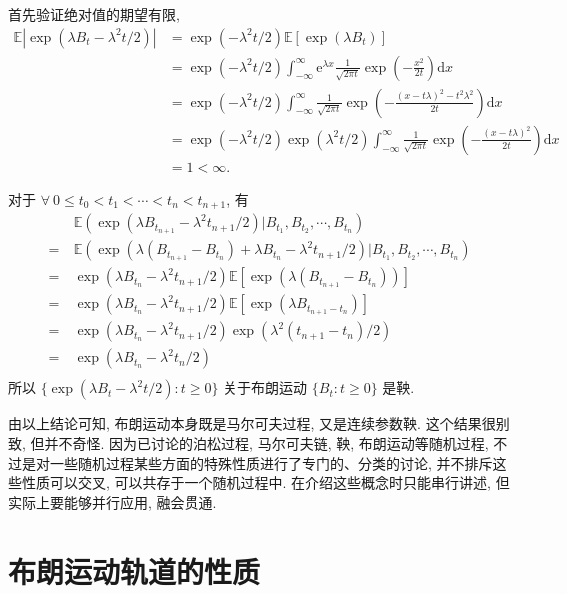 \documentclass[openany]{ctexbook}
\theoremstyle{kaiti}
\theoremstyle{normal}
\begin{document}
首先验证绝对值的期望有限,
\begin{equation}
  \begin{aligned}
    \mathbb{E}|\exp(\lambda B_t-\lambda^2t/2)|
    &=\exp(-\lambda^2t/2)\mathbb{E}[\exp(\lambda B_t)]\\
    &=\exp(-\lambda^2t/2)\int_{-\infty}^\infty\mathrm{e}^{\lambda x}\frac{1}{\sqrt{2\pi t}}\exp\left(-\frac{x^2}{2t}\right)\mathrm{d}x\\
    &=\exp(-\lambda^2t/2)\int_{-\infty}^\infty\frac{1}{\sqrt{2\pi t}}\exp\left(-\frac{(x-t\lambda)^2-t^2\lambda^2}{2t}\right)\mathrm{d}x\\
    &=\exp(-\lambda^2t/2)\exp(\lambda^2t/2)\int_{-\infty}^\infty\frac{1}{\sqrt{2\pi t}}\exp\left(-\frac{(x-t\lambda)^2}{2t}\right)\mathrm{d}x\\
    &=1<\infty.
  \end{aligned}
\end{equation}

对于 $\forall~0\leqslant t_0<t_1<\cdots<t_n<t_{n+1}$, 有
\begin{equation}
  \begin{aligned}
    &~\mathbb{E}(\exp(\lambda B_{t_{n+1}}-\lambda^2t_{n+1}/2)\big|B_{t_1},B_{t_2},\cdots,B_{t_n})\\
    =&~\mathbb{E}(\exp(\lambda(B_{t_{n+1}}-B_{t_n})+\lambda B_{t_n}-\lambda^2t_{n+1}/2)\big|B_{t_1},B_{t_2},\cdots,B_{t_n})\\
    =&~\exp(\lambda B_{t_n}-\lambda^2t_{n+1}/2)\mathbb{E}[\exp(\lambda(B_{t_{n+1}}-B_{t_n}))]\\
    =&~\exp(\lambda B_{t_n}-\lambda^2t_{n+1}/2)\mathbb{E}[\exp(\lambda B_{t_{n+1}-t_n})]\\
    =&~\exp(\lambda B_{t_n}-\lambda^2t_{n+1}/2)\exp(\lambda^2({t_{n+1}-t_n})/2)\\
    =&~\exp(\lambda B_{t_n}-\lambda^2t_{n}/2)\\
  \end{aligned}
\end{equation}
所以 $\{\exp(\lambda B_t-\lambda^2t/2):t\geqslant0\}$ 关于布朗运动 $\{B_t:t\geqslant0\}$ 是鞅.

由以上结论可知, 布朗运动本身既是马尔可夫过程, 又是连续参数鞅. 这个结果很别致, 但并不奇怪. 因为已讨论的泊松过程, 马尔可夫链, 鞅, 布朗运动等随机过程, 不过是对一些随机过程某些方面的特殊性质进行了专门的、分类的讨论, 并不排斥这些性质可以交叉, 可以共存于一个随机过程中. 在介绍这些概念时只能串行讲述, 但实际上要能够并行应用, 融会贯通.

\section{布朗运动轨道的性质}
\end{document}
